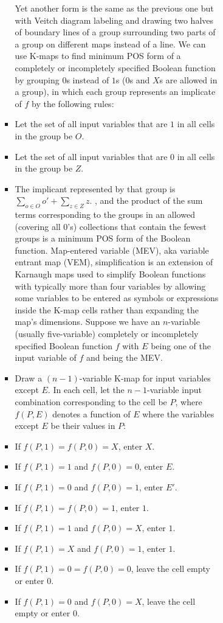 \documentclass[a4paper,12pt]{article}
\begin{document}
\begin{itemize}
\begin{itemize}
\begin{itemize}
\begin{itemize}
\begin{itemize}
\begin{itemize}
\begin{itemize}
Yet another form is the same as the previous one but with Veitch diagram labeling and drawing two halves of boundary lines of a group surrounding two parts of a group on different maps instead of a line.
We can use K-maps to find minimum POS form of a completely or incompletely specified Boolean function by grouping $0$s instead of $1$s ($0$s and $X$s are allowed in a group), in which each group represents an implicate of $f$ by the following rules:
\ben
\item Let the set of all input variables that are $1$ in all cells in the group be $O$.
\item Let the set of all input variables that are $0$ in all cells in the group be $Z$.
\item The implicant represented by that group is $\sum_{o\in O}o'+\sum_{z\in Z}z$.
\een
, and the product of the sum terms corresponding to the groups in an allowed (covering all 0's) collections that contain the fewest groups is a minimum POS form of the Boolean function.
Map-entered variable (MEV), aka variable entrant map (VEM), simplification is an extension of Karnaugh maps used to simplify Boolean functions with typically more than four variables by allowing some variables to be entered as symbols or expressions inside the K-map cells rather than expanding the map's dimensions.
Suppose we have an $n$-variable (usually five-variable) completely or incompletely specified Boolean function $f$ with $E$ being one of the input variable of $f$ and being the MEV.
\ben
\item Draw a $(n-1)$-variable K-map for input variables except $E$. In each cell, let the $n-1$-variable input combination corresponding to the cell be $P$, where $f(P,E)$ denotes a function of $E$ where the variables except $E$ be their values in $P$:
\bit
\item If $f(P,1)=f(P,0)=X$, enter $X$.
\item If $f(P,1)=1$ and $f(P,0)=0$, enter $E$.
\item If $f(P,1)=0$ and $f(P,0)=1$, enter $E'$.
\item If $f(P,1)=f(P,0)=1$, enter $1$.
\item If $f(P,1)=1$ and $f(P,0)=X$, enter $1$.
\item If $f(P,1)=X$ and $f(P,0)=1$, enter $1$.
\item If $f(P,1)=0=f(P,0)=0$, leave the cell empty or enter $0$.
\item If $f(P,1)=0$ and $f(P,0)=X$, leave the cell empty or enter $0$.

\end{itemize}
\end{itemize}
\end{itemize}
\end{itemize}
\end{itemize}
\end{itemize}
\end{itemize}
\end{document}
